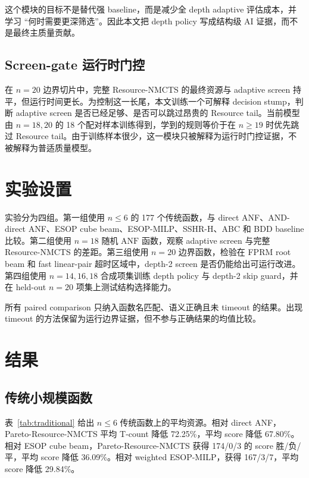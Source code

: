 \documentclass[UTF8,fontset=macnew,11pt]{ctexart}
\newcommand{\method}{Resource-NMCTS}
\newcommand{\pareto}{Pareto-Resource-NMCTS}
\newcommand{\anf}{\ensuremath{\mathrm{ANF}}}
\begin{document}
这个模块的目标不是替代强 baseline，而是减少全 depth adaptive 评估成本，并学习 ``何时需要更深筛选''。因此本文把 depth policy 写成结构级 AI 证据，而不是最终主质量贡献。

\subsection{Screen-gate 运行时门控}

在 $n=20$ 边界切片中，完整 \method{} 的最终资源与 adaptive screen 持平，但运行时间更长。为控制这一长尾，本文训练一个可解释 decision stump，判断 adaptive screen 是否已经足够、是否可以跳过昂贵的 Resource tail。当前模型由 $n=18,20$ 的 18 个配对样本训练得到，学到的规则等价于在 $n\geq19$ 时优先跳过 Resource tail。由于训练样本很少，这一模块只被解释为运行时门控证据，不被解释为普适质量模型。

\section{实验设置}

实验分为四组。第一组使用 $n\leq6$ 的 177 个传统函数，与 direct ANF、AND-direct ANF、ESOP cube beam、ESOP-MILP、SSHR-H、ABC 和 BDD baseline 比较。第二组使用 $n=18$ 随机 \anf{} 函数，观察 adaptive screen 与完整 \method{} 的差距。第三组使用 $n=20$ 边界函数，检验在 FPRM root beam 和 fast linear-pair 超时区域中，depth-2 screen 是否仍能给出可运行改进。第四组使用 $n=14,16,18$ 合成项集训练 depth policy 与 depth-2 skip guard，并在 held-out $n=20$ 项集上测试结构选择能力。

所有 paired comparison 只纳入函数名匹配、语义正确且未 timeout 的结果。出现 timeout 的方法保留为运行边界证据，但不参与正确结果的均值比较。

\section{结果}

\subsection{传统小规模函数}

表~\ref{tab:traditional} 给出 $n\leq6$ 传统函数上的平均资源。相对 direct ANF，\pareto{} 平均 T-count 降低 72.25\%，平均 score 降低 67.80\%。相对 ESOP cube beam，\pareto{} 获得 174/0/3 的 score 胜/负/平，平均 score 降低 36.09\%。相对 weighted ESOP-MILP，获得 167/3/7，平均 score 降低 29.84\%。
\end{document}
